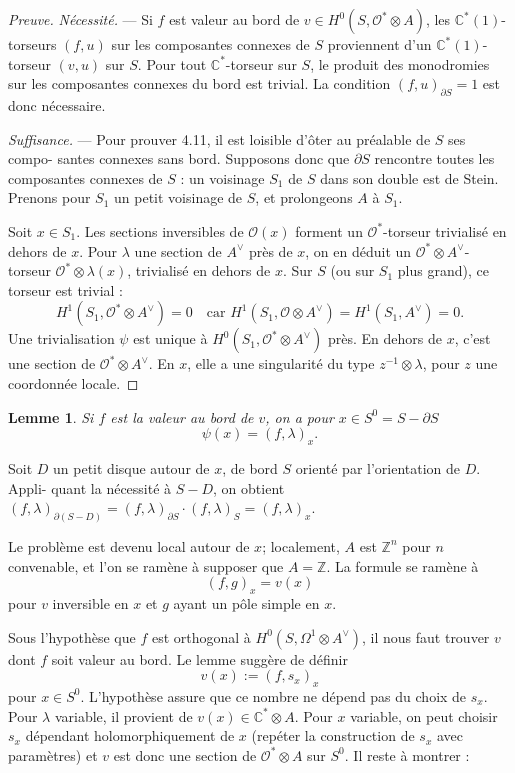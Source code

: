 \documentclass[12pt,a4paper]{article}
\theoremstyle{plain}
\newtheorem{lemma}[theorem]{Lemme}
\theoremstyle{definition}
\theoremstyle{remark}
\newcommand{\cO}{\mathcal{O}}
\newcommand{\Z}{\mathbb{Z}}
\newcommand{\C}{\mathbb{C}}
\providecommand{\cO}{\mathcal{O}}
\begin{document}
\begin{proof}[Preuve]
\textit{Nécessité.} --- Si $f$ est valeur au bord de $v \in H^0(S, \cO^* \otimes A)$, les $\C^*(1)$-torseurs
$(f, u)$ sur les composantes connexes de $S$ proviennent d'un $\C^*(1)$-torseur $(v, u)$ sur $S$.
Pour tout $\C^*$-torseur sur $S$, le produit des monodromies sur les composantes connexes
du bord est trivial. La condition $(f, u)_{\partial S} = 1$ est donc nécessaire.

\textit{Suffisance.} --- Pour prouver 4.11, il est loisible d'ôter au préalable de $S$ ses compo-
santes connexes sans bord. Supposons donc que $\partial S$ rencontre toutes les composantes
connexes de $S$ : un voisinage $S_1$ de $S$ dans son double est de Stein. Prenons pour $S_1$
un petit voisinage de $S$, et prolongeons $A$ à $S_1$.

Soit $x \in S_1$. Les sections inversibles de $\cO(x)$ forment un $\cO^*$-torseur trivialisé en
dehors de $x$. Pour $\lambda$ une section de $A^\vee$ près de $x$, on en déduit un $\cO^* \otimes A^\vee$-torseur $\cO^* \otimes \lambda(x)$,
trivialisé en dehors de $x$. Sur $S$ (ou sur $S_1$ plus grand), ce torseur est trivial :
\[
H^1(S_1, \cO^* \otimes A^\vee) = 0 \quad \text{car } H^1(S_1, \cO \otimes A^\vee) = H^1(S_1, A^\vee) = 0.
\]
Une trivialisation $\psi$ est unique à $H^0(S_1, \cO^* \otimes A^\vee)$ près. En dehors de $x$, c'est une section
de $\cO^* \otimes A^\vee$. En $x$, elle a une singularité du type $z^{-1} \otimes \lambda$, pour $z$ une coordonnée locale.
\end{proof}

\begin{lemma}
Si $f$ est la valeur au bord de $v$, on a pour $x \in S^0 = S - \partial S$
\[
\psi(x) = (f, \lambda)_x.
\]
\end{lemma}

Soit $D$ un petit disque autour de $x$, de bord $S$ orienté par l'orientation de $D$. Appli-
quant la nécessité à $S - D$, on obtient $(f, \lambda)_{\partial(S-D)} = (f, \lambda)_{\partial S} \cdot (f, \lambda)_S = (f, \lambda)_x$.

Le problème est devenu local autour de $x$; localement, $A$ est $\Z^n$ pour $n$ convenable, et
l'on se ramène à supposer que $A = \Z$. La formule se ramène à
\[
(f, g)_x = v(x)
\]
pour $v$ inversible en $x$ et $g$ ayant un pôle simple en $x$.

Sous l'hypothèse que $f$ est orthogonal à $H^0(S, \Omega^1 \otimes A^\vee)$, il nous faut trouver $v$
dont $f$ soit valeur au bord. Le lemme suggère de définir
\[
v(x) := (f, s_x)_x
\]
pour $x \in S^0$. L'hypothèse assure que ce nombre ne dépend pas du choix de $s_x$. Pour
$\lambda$ variable, il provient de $v(x) \in \C^* \otimes A$. Pour $x$ variable, on peut choisir $s_x$ dépendant
holomorphiquement de $x$ (repéter la construction de $s_x$ avec paramètres) et $v$ est donc
une section de $\cO^* \otimes A$ sur $S^0$. Il reste à montrer :
\end{document}
